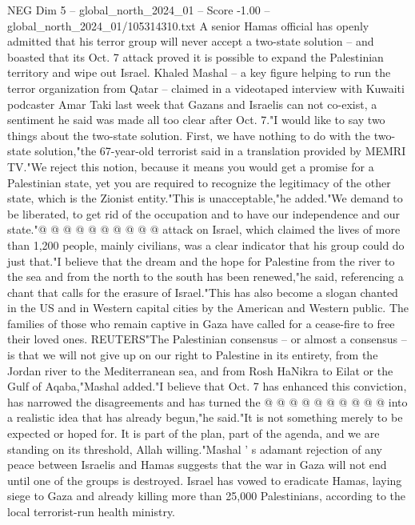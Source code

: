 \begin{textsample}{NEG Dim 5 – global\_north\_2024\_01 – Score -1.00 – global\_north\_2024\_01/105314310.txt}  \label{ex:f5_neg_343}
A senior Hamas official has openly admitted that his terror group will never accept a two-state solution -- and boasted that its Oct. 7 attack proved it is possible to expand the Palestinian territory and wipe out Israel.
Khaled Mashal -- a key figure helping to run the terror organization from Qatar -- claimed in a videotaped interview with Kuwaiti podcaster Amar Taki last week that Gazans and Israelis can not co-exist, a sentiment he said was made all too clear after Oct. 7."I would like to say two things about the two-state solution.
First, we have nothing to do with the two-state solution,"the 67-year-old terrorist said in a translation provided by MEMRI TV."We reject this notion, because it means you would get a promise for a Palestinian state, yet you are required to recognize the legitimacy of the other state, which is the Zionist entity."This is unacceptable,"he added."We demand to be liberated, to get rid of the occupation and to have our independence and our state."@ @ @ @ @ @ @ @ @ @ attack on Israel, which claimed the lives of more than 1,200 people, mainly civilians, was a clear indicator that his group could do just that."I believe that the dream and the hope for Palestine from the river to the sea and from the north to the south has been renewed,"he said, referencing a chant that calls for the erasure of Israel."This has also become a slogan chanted in the US and in Western capital cities by the American and Western public.
The families of those who remain captive in Gaza have called for a cease-fire to free their loved ones.
REUTERS"The Palestinian consensus -- or almost a consensus -- is that we will not give up on our right to Palestine in its entirety, from the Jordan river to the Mediterranean sea, and from Rosh HaNikra to Eilat or the Gulf of Aqaba,"Mashal added."I believe that Oct. 7 has enhanced this conviction, has narrowed the disagreements and has turned the @ @ @ @ @ @ @ @ @ @ into a realistic idea that has already begun,"he said."It is not something merely to be expected or hoped for.
It is part of the plan, part of the agenda, and we are standing on its threshold, Allah willing."Mashal ' s adamant rejection of any peace between Israelis and Hamas suggests that the war in Gaza will not end until one of the groups is destroyed.
Israel has vowed to eradicate Hamas, laying siege to Gaza and already killing more than 25,000 Palestinians, according to the local terrorist-run health ministry.

\end{textsample}
